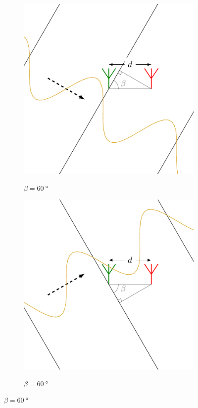\begin{figure}
    \caption{\ac{AoA} com par de antenas em diversas direções equivalentes.}
    \label{fig:AoA}

    \hfill
    \begin{subfigure}[b]{0.45\textwidth}
        \centering
        \caption{$\beta=\SI{60}{\degree}$}
        \includegraphics{../pictures/AoA_1.pdf}
        \label{fig:AoA:1}
    \end{subfigure}
    \hfill
    \begin{subfigure}[b]{0.45\textwidth}
        \centering
        \caption{$\beta=\SI{60}{\degree}$}
        \includegraphics{../pictures/AoA_2.pdf}
        \label{fig:AoA:2}
    \end{subfigure}
    \hfill


\end{figure}

